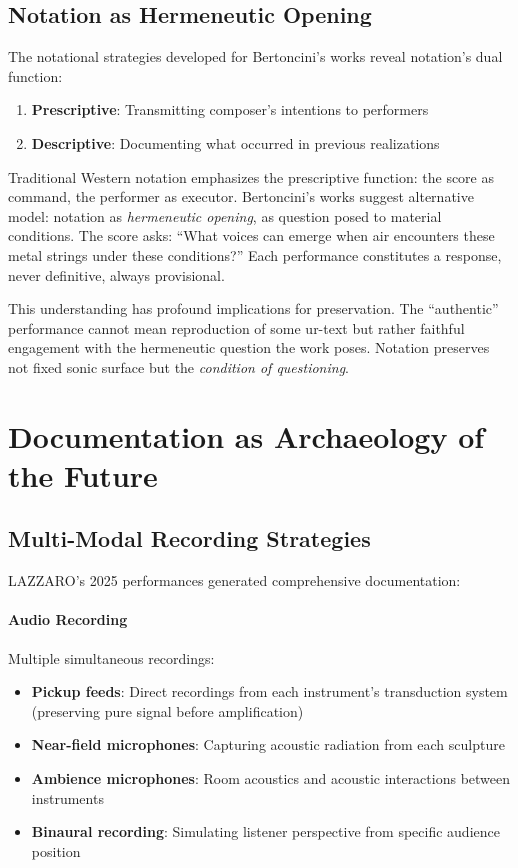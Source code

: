 \subsection{Notation as Hermeneutic Opening}

The notational strategies developed for Bertoncini's works reveal notation's 
dual function:
\begin{enumerate}
  \item \textbf{Prescriptive}: Transmitting composer's intentions to performers
  \item \textbf{Descriptive}: Documenting what occurred in previous realizations
\end{enumerate}

Traditional Western notation emphasizes the prescriptive function: the score 
as command, the performer as executor. Bertoncini's works suggest alternative 
model: notation as \emph{hermeneutic opening}, as question posed to material 
conditions. The score asks: ``What voices can emerge when air encounters these 
metal strings under these conditions?'' Each performance constitutes a response, 
never definitive, always provisional.

This understanding has profound implications for preservation. The ``authentic'' 
performance cannot mean reproduction of some ur-text but rather faithful 
engagement with the hermeneutic question the work poses. Notation preserves 
not fixed sonic surface but the \emph{condition of questioning}.

\section{Documentation as Archaeology of the Future}

\subsection{Multi-Modal Recording Strategies}

LAZZARO's 2025 performances generated comprehensive documentation:

\paragraph{Audio Recording}
Multiple simultaneous recordings:
\begin{itemize}
  \item \textbf{Pickup feeds}: Direct recordings from each instrument's 
  transduction system (preserving pure signal before amplification)
  \item \textbf{Near-field microphones}: Capturing acoustic radiation from 
  each sculpture
  \item \textbf{Ambience microphones}: Room acoustics and acoustic interactions 
  between instruments
  \item \textbf{Binaural recording}: Simulating listener perspective from 
  specific audience position
\end{itemize}

